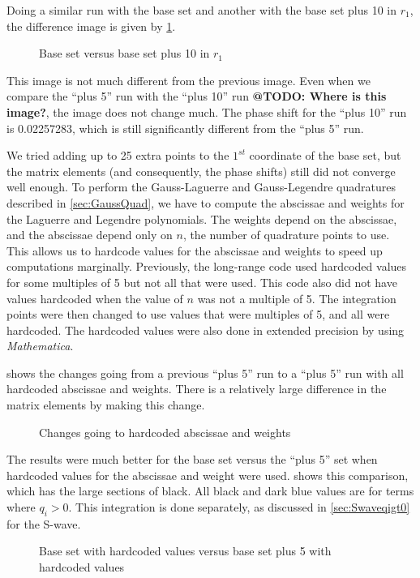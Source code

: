 \documentclass[Dissertation.tex]{subfiles}
\begin{document}
Doing a similar run with the base set and another with the base set plus 10 in $r_1$, the difference image is given by \cref{fig:BasevsBaseplus10}.
\begin{figure}
	\centering
	\caption{Base set versus base set plus 10 in $r_1$}
	\label{fig:BasevsBaseplus10}
\end{figure}
\noindent This image is not much different from the previous image. Even when we compare the ``plus 5'' run with the ``plus 10'' run \textbf{@TODO: Where is this image?}, the image does not change much. The phase shift for the ``plus 10'' run is 0.02257283, which is still significantly different from the ``plus 5'' run.

We tried adding up to 25 extra points to the $1^{st}$ coordinate of the base set, but the matrix elements (and consequently, the phase shifts) still did not converge well enough. To perform the Gauss-Laguerre and Gauss-Legendre quadratures described in \cref{sec:GaussQuad}, we have to compute the abscissae and weights for the Laguerre and Legendre polynomials. The weights depend on the abscissae, and the abscissae depend only on $n$, the number of quadrature points to use. This allows us to hardcode values for the abscissae and weights to speed up computations marginally. Previously, the long-range code used hardcoded values for some multiples of 5 but not all that were used. This code also did not have values hardcoded when the value of $n$ was not a multiple of 5. The integration points were then changed to use values that were multiples of 5, and all were hardcoded. The hardcoded values were also done in extended precision by using \emph{Mathematica}.

 shows the changes going from a previous ``plus 5'' run to a ``plus 5'' run with all hardcoded abscissae and weights. There is a relatively large difference in the matrix elements by making this change.
\begin{figure}
	\centering
	\caption{Changes going to hardcoded abscissae and weights}
	\label{fig:Base5vsBase5hardcoderound}
\end{figure}

The results were much better for the base set versus the ``plus 5'' set when hardcoded values for the abscissae and weight were used.  shows this comparison, which has the large sections of black. All black and dark blue values are for terms where $q_i > 0$. This integration is done separately, as discussed in \cref{sec:Swaveqigt0} for the S-wave.
\begin{figure}
	\centering
	\caption[Base set with hardcoded values vs. base set plus 5 with hardcoded values]{Base set with hardcoded values versus base set plus 5 with hardcoded values}
	\label{fig:BasehardcodevsBase5hardcode}
\end{figure}
\end{document}
